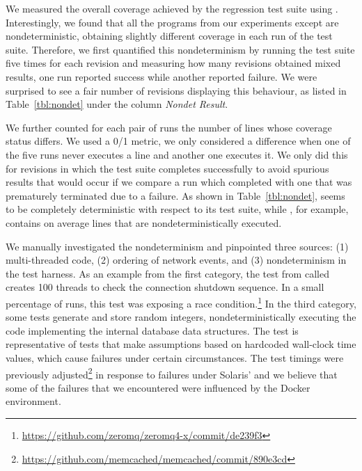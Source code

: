 We measured the overall coverage achieved by the regression test suite
using \gcov.  Interestingly, we found that all the programs from our
experiments except \binutils are nondeterministic, obtaining slightly
different coverage in each run of the test suite.  Therefore, we first
quantified this nondeterminism by running the test suite five times
for each revision and measuring how many revisions obtained mixed
results, \ie one run reported success while another reported failure.
We were surprised to see a fair number of revisions displaying this
behaviour, as listed in Table~\ref{tbl:nondet} under the column
\textit{Nondet Result}.


We further counted for each pair of runs the number of lines whose
coverage status differs. We used a 0/1 metric, \ie we only considered
a difference when one of the five runs never executes a line and
another one executes it. We only did this for revisions in which the
test suite completes successfully to avoid spurious results that would
occur if we compare a run which completed with one that was
prematurely terminated due to a failure.  As shown in
Table~\ref{tbl:nondet}, \binutils seems to be completely deterministic
with respect to its test suite, while \redis, for example, contains on
average \redisNonDetAverage lines that are nondeterministically
executed.

We manually investigated the nondeterminism and pinpointed three
sources: (1) multi-threaded code, (2) ordering of network events, and
(3) nondeterminism in the test harness.  As an example from the first
category, the test from \zeromq called 
creates 100 threads to check the connection shutdown sequence. In a
small percentage of runs, this test was exposing a race
condition.\footnote{\url{https://github.com/zeromq/zeromq4-x/commit/de239f3}}
In the third category, some \redis tests generate and store random
integers, nondeterministically executing the code implementing the
internal database data structures.  The \memcached test
 is representative of tests that make assumptions
based on hardcoded wall-clock time values, which cause failures under
certain circumstances. The test timings were previously
adjusted\footnote{\url{https://github.com/memcached/memcached/commit/890e3cd}}
in response to failures under Solaris'  and we believe
that some of the failures that we encountered were influenced by the
Docker environment.

